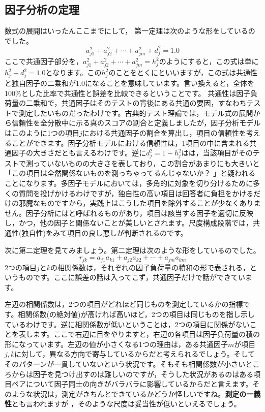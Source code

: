 \documentclass{ltjsbook}
\begin{document}
\subsection{因子分析の定理}
数式の展開はいったんここまでにして，
第一定理は次のような形をしているのでした。
\[a_{j1}^2+a_{j2}^2+ \cdots + a_{jm}^2 + d_j^2 = 1.0 \]
ここで共通因子部分を，$a_{j1}^2+a_{j2}^2+ \cdots + a_{jm}^2=h_j^2$のようにすると，この式は単に$h_j^2 + d_j^2 = 1.0$となります。この$h_j^2$のことをとくにといいますが，この式は共通性と独自因子の二乗和が$1.0$になることを意味しています。言い換えると，全体を100\%とした比率で共通性と誤差を比較できるということです。
共通性は因子負荷量の二乗和で，共通因子はそのテストの背後にある共通の要因，すなわちテストで測定したいものだったわけです。古典的テスト理論では，モデル式の展開から信頼性を全分散中に示る真のスコアの割合と定義しましたが，因子分析モデルはこのように1つの項目$j$における共通因子の割合を算出し，項目の信頼性を考えることができます。因子分析モデルにおける信頼性は，1項目の中に含まれる共通因子の大きさだとも言えるわけです。逆に$d_j^2=1-h_j^2$はは，当該項目がそのテストで測っていないものの大きさを表しており，この割合があまりにも大きいと「この項目は全然関係ないものを測っちゃってるんじゃないか？ 」と疑われることになります。多因子モデルにおいては，多角的に対象を切り分けるために多くの質問を投げかけるわけですが，独自性の高い項目は回答者に負担をかけるだけの邪魔なものですから，実践上はこうした項目を除外することが少なくありません。因子分析にはと呼ばれるものがあり，項目は該当する因子を適切に反映し，かつ，他の因子と関係ないことが美しいとされます。尺度構成段階では，共通性(独自性)をみて項目の良し悪しが判断されるのです。

次に第二定理を見てみましょう。第二定理は次のような形をしているのでした。
\[  r_{jk}=a_{j1}a_{k1}+a_{j2}a_{k2}+ \cdots +a_{jm}a_{km} \]
2つの項目$j$と$k$の相関係数は，それぞれの因子負荷量の積和の形で表される，というものです。ここに誤差の話は入ってこず，共通因子だけで話ができています。

左辺の相関係数は，2つの項目がどれほど同じものを測定しているかの指標です。相関係数(の絶対値)が高ければ高いほど，2つの項目は同じものを指し示しているわけです。逆に相関係数が低いということは，2つの項目に関係がないことを表します。ここで右辺に目をやりますと，右辺の各項目は因子負荷量の積の形になっています。左辺の値が小さくなる1つの理由は，ある共通因子$m$が項目$j,k$に対して，異なる方向で寄与しているからだと考えられるでしょう。そしてそのパターンが一貫していないという状況です。そもそも相関係数が小さいところからは因子を見つけ出すのは難しいのですが，そうした状況があるのはある項目ペアについて因子同士の向きがバラバラに影響しているからだと言えます。そのような状況は，測定がきちんとできているかどうか怪しいですね。\textbf{測定の一義性}とも言われますが
，そのような尺度は妥当性が低いといえるでしょう。
\end{document}
